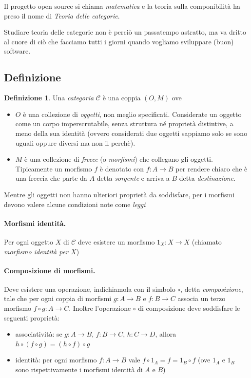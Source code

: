 \documentclass[12pt]{article}
\theoremstyle{definition}
\newtheorem{definition}{Definizione}[section]
\begin{document}
Il progetto open source si chiama \emph{matematica} e la teoria sulla componibilità ha preso il nome di \emph{Teoria delle categorie}.

Studiare teoria delle categorie non è perciò un passatempo astratto, ma va dritto al cuore di ciò che facciamo tutti i giorni quando vogliamo
sviluppare (buon) software.

\subsection{Definizione}

\begin{definition}
Una \emph{categoria} $\mathcal{C}$ è una coppia $(O, M)$ ove

\begin{itemize}
  \item $O$ è una collezione di \emph{oggetti}, non meglio specificati. Considerate un oggetto come un corpo imperscrutabile,
  senza struttura né proprietà distintive, a meno della sua identità (ovvero considerati due oggetti sappiamo solo se sono uguali oppure diversi
  ma non il perchè).
  \item $M$ è una collezione di \emph{frecce} (o \emph{morfismi}) che collegano gli oggetti. Tipicamente un morfismo $f$ è denotato con $f: A \rightarrow B$
  per rendere chiaro che è una freccia che parte da $A$ detta \emph{sorgente} e arriva a $B$ detta \emph{destinazione}.
\end{itemize}

Mentre gli oggetti non hanno ulteriori proprietà da soddisfare, per i morfismi devono valere alcune condizioni note come \emph{leggi}\\

\paragraph{Morfismi identità.} Per ogni oggetto $X$ di $\mathcal{C}$ deve esistere un morfismo $1_X: X \rightarrow X$ (chiamato \emph{morfismo identità per $X$})\\

\paragraph{Composizione di morfismi.} Deve esistere una operazione, indichiamola con il simbolo $\circ$, detta \emph{composizione}, tale che per ogni coppia di morfismi $g: A \rightarrow B$
e $f: B \rightarrow C$ associa un terzo morfismo $f \circ g: A \rightarrow C$. Inoltre l'operazione $\circ$ di composizione deve soddisfare le seguenti proprietà:

\begin{itemize}
  \item associatività: se $g: A \rightarrow B$, $f: B \rightarrow C$, $h: C \rightarrow D$, allora $h \circ (f \circ g) = (h \circ f) \circ g$
  \item identità: per ogni morfismo $f: A \rightarrow B$ vale $f \circ 1_A = f = 1_B \circ f$ (ove $1_A$ e $1_B$ sono rispettivamente i morfismi identità di $A$ e $B$)
\end{itemize}

\end{definition}
\end{document}
